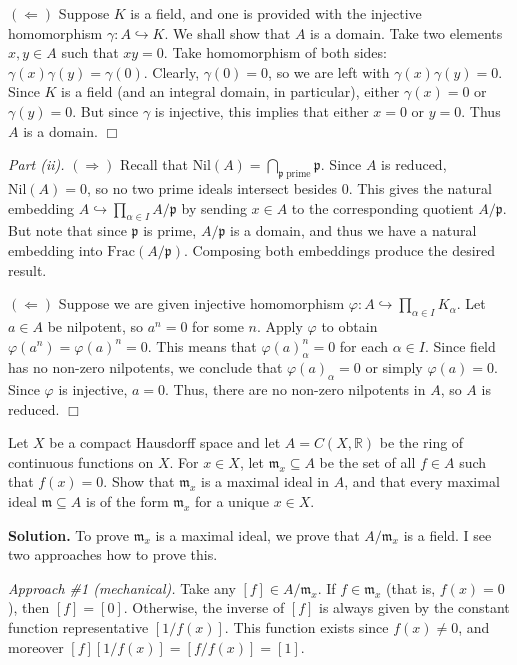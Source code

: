 \documentclass{template}
\newcommand{\qedwhite}{\hfill \ensuremath{\Box}}
\begin{document}
$(\Leftarrow)$ Suppose $K$ is a field, and one is provided with the injective
homomorphism $\gamma: A \hookrightarrow K$. We shall show that $A$ is a domain. Take two
elements $x,y \in A$ such that $xy=0$. Take homomorphism of both sides:
$\gamma(x)\gamma(y)=\gamma(0)$. Clearly, $\gamma(0)=0$, so we are left with
$\gamma(x)\gamma(y) = 0$. Since $K$ is a field (and an integral domain, in 
particular), either $\gamma(x) = 0$ or $\gamma(y) = 0$. But since $\gamma$
is injective, this implies that either $x=0$ or $y=0$. Thus $A$ is 
a domain. \qedwhite

\textit{Part (ii).} $(\Rightarrow)$  Recall that $\text{Nil}(A) =
\bigcap_{\mathfrak{p} \; \text{prime}}\mathfrak{p}$. Since $A$ is reduced,
$\text{Nil}(A) = 0$, so no two prime ideals intersect besides $0$. This gives
the natural embedding $A \hookrightarrow \prod_{\alpha \in I}A/\mathfrak{p}$ by
sending $x \in A$ to the corresponding quotient $A/\mathfrak{p}$. But note that
since $\mathfrak{p}$ is prime, $A/\mathfrak{p}$ is a domain, and thus we have a
natural embedding into $\text{Frac}(A/\mathfrak{p})$. Composing both embeddings 
produce the desired result.

$(\Leftarrow)$ Suppose we are given injective homomorphism $\varphi: A
\hookrightarrow \prod_{\alpha \in I}K_{\alpha}$. Let $a \in A$ be nilpotent, so
$a^n = 0$ for some $n$. Apply $\varphi$ to obtain $\varphi(a^n) =
\varphi(a)^n=0$. This means that $\varphi(a)_{\alpha}^n=0$ for each $\alpha \in
I$. Since field has no non-zero nilpotents, we conclude that
$\varphi(a)_{\alpha}=0$ or simply $\varphi(a)=0$. Since $\varphi$ is injective,
$a=0$. Thus, there are no non-zero nilpotents in $A$, so $A$ is reduced. \qedwhite

\begin{problem}[Exercise 4]
    Let $X$ be a compact Hausdorff space and let $A=C(X,\mathbb{R})$ be the ring
of continuous functions on $X$. For $x \in X$, let $\mathfrak{m}_x \subseteq A$
be the set of all $f \in A$ such that $f(x)=0$. Show that $\mathfrak{m}_x$ is a
maximal ideal in $A$, and that every maximal ideal $\mathfrak{m} \subseteq A$ is
of the form $\mathfrak{m}_x$ for a unique $x \in X$.
\end{problem}

\textbf{Solution.} To prove $\mathfrak{m}_x$ is a maximal ideal, we prove that
$A/\mathfrak{m}_x$ is a field. I see two approaches how to prove this. 

\textit{Approach \#1 (mechanical).} Take any $[f] \in A/\mathfrak{m}_x$. If $f
\in \mathfrak{m}_x$ (that is, $f(x)=0$), then $[f] = [0]$. Otherwise, the
inverse of $[f]$ is always given by the constant function representative
$[1/f(x)]$. This function exists since $f(x) \neq 0$, and moreover $[f][1/f(x)]
= [f/f(x)] = [1]$.
\end{document}
